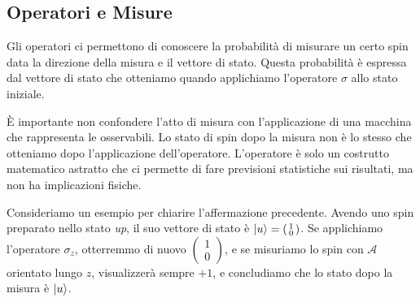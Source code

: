 %
%
\subsection{Operatori e Misure}
Gli operatori ci permettono di conoscere la probabilità di misurare un certo spin data la direzione della misura e il vettore di stato. Questa probabilità è espressa dal vettore di stato che otteniamo quando applichiamo l'operatore $\sigma$ allo stato iniziale.

È importante non confondere l'atto di misura con l'applicazione di una macchina che rappresenta le osservabili. Lo stato di spin dopo la misura non è lo stesso che otteniamo dopo l'applicazione dell'operatore. L'operatore è solo un costrutto matematico astratto che ci permette di fare previsioni statistiche sui risultati, ma non ha implicazioni fisiche.

Consideriamo un esempio per chiarire l'affermazione precedente. Avendo uno spin preparato nello stato \emph{up}, il suo vettore di stato è $\Ket{u} = \left(\begin{smallmatrix}1\\0\end{smallmatrix}\right)$. Se applichiamo l'operatore $\sigma_z$, otterremmo di nuovo $\left(\begin{smallmatrix}1\\0\end{smallmatrix}\right)$, e se misuriamo lo spin con $\mathcal{A}$ orientato lungo $z$, visualizzerà sempre $+1$, e concludiamo che lo stato dopo la misura è $\Ket{u}$.

